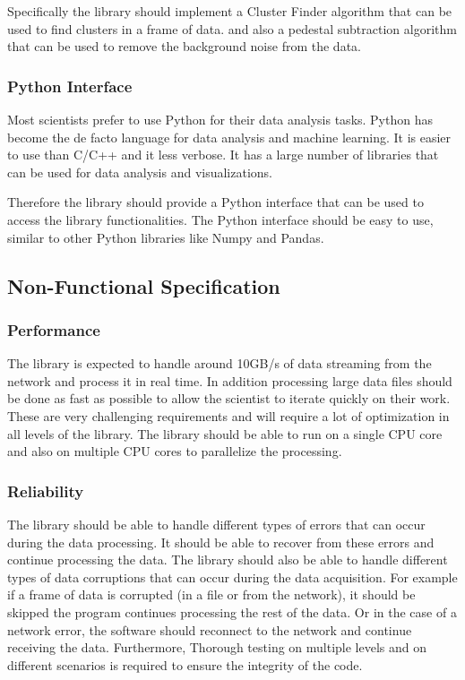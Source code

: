 \begin{spacing}{1.2}
    Specifically the library should implement a Cluster Finder algorithm that can be used to find clusters in a frame of data.
    and also a pedestal subtraction algorithm that can be used to remove the background noise from the data.

    \subsubsection{Python Interface}

    Most scientists prefer to use Python for their data analysis tasks. Python has
    become the de facto language for data analysis and machine learning.
    It is easier to use than C/C++ and it less verbose. It has a large number of libraries
    that can be used for data analysis and visualizations.

    Therefore the library should provide a Python interface that can be used to access the library functionalities.
    The Python interface should be easy to use, similar to other Python libraries like Numpy and Pandas.


    \subsection{Non-Functional Specification}
    \subsubsection{Performance}
    The library is expected to handle around 10GB/s of data streaming from the network and process it in real time.
    In addition processing large data files should be done as fast as possible to allow the scientist to iterate quickly on their work.
    These are very challenging requirements and will require a lot of optimization in all levels of the library.
    The library should be able to run on a single CPU core and also on multiple CPU cores to parallelize the processing.

    \subsubsection{Reliability}
    The library should be able to handle different types of errors that can occur during the data processing.
    It should be able to recover from these errors and continue processing the data.
    The library should also be able to handle different types of data corruptions that can occur during the data acquisition.
    For example if a frame of data is corrupted (in a file or from the network), it should be skipped the program continues processing the rest of the data.
    Or in the case of a network error, the software should reconnect to the network and continue receiving the data.
    Furthermore, Thorough testing on multiple levels and on different scenarios is required to ensure the integrity of the code.


\end{spacing}
